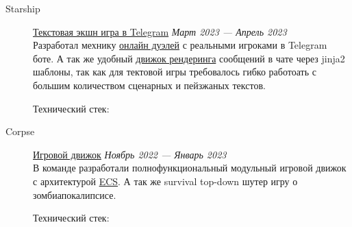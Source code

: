 \documentclass[margin,line]{resume}
\begin{document}
\begin{resume}
\begin{description}
  \item[Starship]\small{\href{https://github.com/starship-crew}{Текстовая
      экшн игра в Telegram}
    \hfill \textsl{Март 2023 — Апрель 2023\vspace{2mm}}}\\
    Разработал мехнику
    \href{https://github.com/starship-crew/telegram-client/blob/main/app/handlers/fight.py}{онлайн
    дуэлей} с реальными игроками в Telegram боте. А
    так же удобный
    \href{https://github.com/starship-crew/telegram-client/blob/main/app/template.py}{движок
    рендеринга}
    сообщений в чате через jinja2 шаблоны, так как для тектовой игры
    требовалось гибко работоать с большим количеством сценарных и
    пейзжаных текстов.

    Технический стек:

    \vspace{3mm}

  \item[Corpse]\small{\href{https://github.com/corpse-inc/corpse}{Игровой
      движок}
    \hfill \textsl{Ноябрь 2022 — Январь 2023\vspace{2mm}}}\\
    В команде разработали полнофункциональный модульный
    игровой движок с архитектурой
    \href{https://en.wikipedia.org/wiki/Entity_component_system#:~:text=Entity%E2%80%93component%E2%80%93system%20(ECS,Entity%E2%80%93Component%E2%80%93System%20layout.}{ECS}.
      А так же survival top-down шутер игру о зомбиапокалипсисе.

      Технический стек:


\end{description}
\end{resume}
\end{document}
